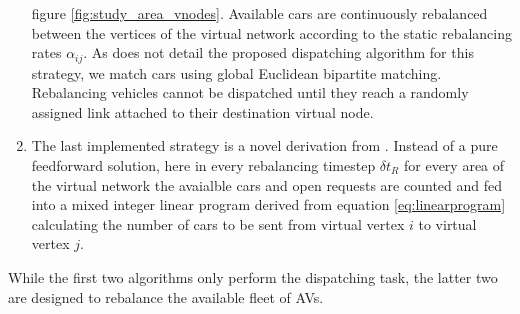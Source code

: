 \begin{enumerate}
figure \ref{fig:study_area_vnodes}. Available cars are continuously rebalanced between
the vertices of the virtual network according to the static rebalancing rates $\alpha_{ij}$.
As \cite{pavone2011load} does not detail the proposed dispatching algorithm for this strategy, we match
cars using global Euclidean bipartite matching. Rebalancing vehicles cannot be dispatched
until they reach a randomly assigned link attached to their destination virtual node.
\item The last implemented strategy is a novel derivation from \cite{pavone2011load}. Instead of a pure
feedforward solution, here in every rebalancing timestep $\delta t_R$
for every area of the virtual network the avaialble cars and open requests are counted
and fed into a mixed integer linear program derived from equation \ref{eq:linearprogram}
calculating the number of cars to be sent from virtual vertex $i$ to virtual vertex $j$.
\end{enumerate}

While the first two algorithms only perform the dispatching task, the latter two
are designed to rebalance the available fleet of AVs.
